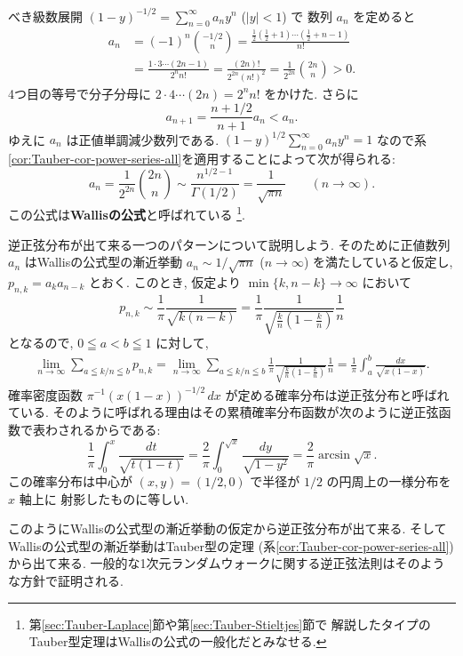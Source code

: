\documentclass[12pt,twoside]{jarticle}
\theoremstyle{jplain}
\theoremstyle{jplain}
\theoremstyle{jplain}
\numberwithin{theorem}{section}
\numberwithin{equation}{section}
\numberwithin{figure}{section}
\numberwithin{table}{section}
\newcommand\secref[1]{第\ref{#1}節}
\newcommand\corref[1]{系\ref{#1}}
\begin{document}
べき級数展開 $(1-y)^{-1/2}=\sum_{n=0}^\infty a_n y^n$ ($|y|<1$) で
数列 $a_n$ を定めると
\begin{align*}
a_n
&
=(-1)^n\binom{-1/2}{n}
=\frac{\frac{1}{2}(\frac{1}{2}+1)\cdots(\frac{1}{2}+n-1)}{n!}
\\ &
=\frac{1\cdot 3\cdots(2n-1)}{2^n n!}
=\frac{(2n)!}{2^{2n}(n!)^2}
=\frac{1}{2^{2n}}\binom{2n}{n}>0.
\end{align*}
4つ目の等号で分子分母に $2\cdot 4\cdots(2n)=2^n n!$ をかけた.
さらに
\[
a_{n+1}=\frac{n+1/2}{n+1}a_n<a_n.
\] 
ゆえに $a_n$ は正値単調減少数列である. 
$(1-y)^{1/2}\sum_{n=0}^\infty a_n y^n=1$
なので\corref{cor:Tauber-cor-power-series-all}を適用することによって次が得られる:
\[
a_n=\frac{1}{2^{2n}}\binom{2n}{n}
\sim \frac{n^{1/2-1}}{\Gamma(1/2)}
=\frac{1}{\sqrt{\pi n}}
\qquad (n\to\infty).
\]
この公式は{\bf Wallisの公式}と呼ばれている%
\footnote{\secref{sec:Tauber-Laplace}や\secref{sec:Tauber-Stieltjes}で
解説したタイプのTauber型定理はWallisの公式の一般化だとみなせる.}. 

逆正弦分布が出て来る一つのパターンについて説明しよう.
そのために正値数列 $a_n$ はWallisの公式型の漸近挙動 
$a_n\sim 1/\sqrt{\pi n}$ ($n\to\infty$) を満たしていると仮定し, 
$p_{n,k}=a_k a_{n-k}$ とおく. 
このとき, 仮定より $\min\{k,n-k\}\to\infty$ において
\[
p_{n,k} \sim \frac{1}{\pi}\frac{1}{\sqrt{k(n-k)}}
= \frac{1}{\pi}\frac{1}{\sqrt{\frac{k}{n}\left(1-\frac{k}{n}\right)}}\frac{1}{n}
\]
となるので, $0\leqq a<b\leqq1$ に対して,
\begin{align*}
\lim_{n\to\infty}
\sum_{a\leqq k/n\leqq b} p_{n,k}
=\lim_{n\to\infty}
\sum_{a\leqq k/n\leqq b}
\frac{1}{\pi}\frac{1}{\sqrt{\frac{k}{n}\left(1-\frac{k}{n}\right)}}\frac{1}{n}
=\frac{1}{\pi}\int_a^b\frac{dx}{\sqrt{x(1-x)}}.
\end{align*}
確率密度函数 $\pi^{-1}(x(1-x))^{-1/2}\,dx$ が定める確率分布は逆正弦分布と呼ばれている.
そのように呼ばれる理由はその累積確率分布函数が次のように逆正弦函数で表わされるからである:
\[
\frac{1}{\pi}\int_0^x \frac{dt}{\sqrt{t(1-t)}} 
=\frac{2}{\pi}\int_0^{\sqrt{x}}\frac{dy}{\sqrt{1-y^2}}
= \frac{2}{\pi}\arcsin\sqrt{x}.
\]
この確率分布は中心が $(x,y)=(1/2,0)$ で半径が $1/2$ の円周上の一様分布を $x$ 軸上に
射影したものに等しい.

このようにWallisの公式型の漸近挙動の仮定から逆正弦分布が出て来る.
そしてWallisの公式型の漸近挙動はTauber型の定理
(\corref{cor:Tauber-cor-power-series-all})から出て来る.
一般的な1次元ランダムウォークに関する逆正弦法則はそのような方針で証明される.
\end{document}
